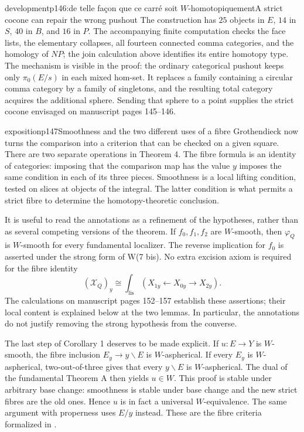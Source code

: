 \begin{dcomment}{development}{p146:de telle façon que ce carré soit $W$-homotopiquement}{A strict cocone can repair the wrong pushout}
The construction has $25$ objects in $E$, $14$ in $S$, $40$ in $B$, and $16$ in $P$. The accompanying finite computation checks the face lists, the elementary collapses, all fourteen connected comma categories, and the homology of $NP$; the join calculation above identifies its entire homotopy type. The mechanism is visible in the proof: the ordinary categorical pushout keeps only $\pi_0(E/s)$ in each mixed hom-set. It replaces a family containing a circular comma category by a family of singletons, and the resulting total category acquires the additional sphere. Sending that sphere to a point supplies the strict cocone envisaged on manuscript pages 145--146.
\end{dcomment}

\begin{dcomment}{exposition}{p147}{Smoothness and the two different uses of a fibre}
Grothendieck now turns the comparison into a criterion that can be checked on a given square. There are two separate operations in Theorem 4. The fibre formula is an identity of categories: imposing that the comparison map has the value $y$ imposes the same condition in each of its three pieces. Smoothness is a local lifting condition, tested on slices at objects of the integral. The latter condition is what permits a strict fibre to determine the homotopy-theoretic conclusion.

It is useful to read the annotations as a refinement of the hypotheses, rather than as several competing versions of the theorem. If $f_0,f_1,f_2$ are $W$-smooth, then $\varphi_Q$ is $W$-smooth for every fundamental localizer. The reverse implication for $f_0$ is asserted under the strong form of W(7 bis). No extra excision axiom is required for the fibre identity
\[
 (\mathcal X_Q)_y\cong
 \int_{\mathrm{lis}}(X_{1y}\leftarrow X_{0y}\to X_{2y}).
\]
The calculations on manuscript pages 152--157 establish these assertions; their local content is explained below at the two lemmas. In particular, the annotations do not justify removing the strong hypothesis from the converse.

The last step of Corollary 1 deserves to be made explicit. If $u:E\to Y$ is $W$-smooth, the fibre inclusion $E_y\to y\backslash E$ is $W$-aspherical. If every $E_y$ is $W$-aspherical, two-out-of-three gives that every $y\backslash E$ is $W$-aspherical. The dual of the fundamental Theorem A then yields $u\in W$. This proof is stable under arbitrary base change: smoothness is stable under base change and the new strict fibres are the old ones. Hence $u$ is in fact a universal $W$-equivalence. The same argument with properness uses $E/y$ instead. These are the fibre criteria formalized in \citet[Theorem~1.2]{Maltsiniotis2005Asphericite}.


\end{dcomment}
